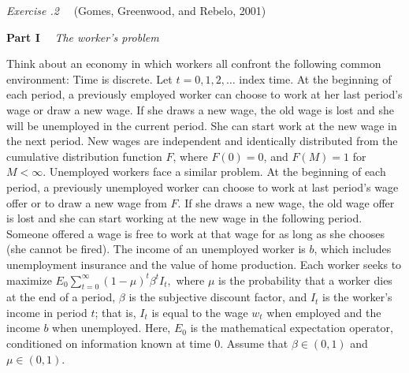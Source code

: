 \vfil\eject
\medskip\noindent
{\it Exercise \the\chapternum.2} \ \ (Gomes, Greenwood,
and Rebelo, 2001)
%

\medskip\noindent
{\bf Part I} \ \ {\it The worker's problem}

\medskip\noindent
Think about an economy in which workers  all confront the following common
environment: Time is discrete.  Let $t=0, 1, 2, \ldots$ index time.
At the beginning of each period, a  previously employed
worker can choose to work at her last
period's wage or  draw a new wage.
 If she draws a new wage, the old wage is
lost and she will be unemployed in the current period.  She can start work
at the new wage in the next period.
New wages are independent and identically
distributed from the cumulative
distribution function $F$, where $F(0)=0$, and $F(M)=1$ for $M<\infty$. Unemployed workers face a similar problem. At the beginning of each period, a previously unemployed worker can choose to work at last period's wage offer or to draw a new wage from $F$. If she draws a new wage, the old wage offer is lost and she can start working at the new wage in the following period. Someone offered a wage is free to work at that wage for as long as she
chooses (she cannot be fired).  The income of an unemployed
worker is $b$, which includes unemployment insurance and the
value of home production.  Each worker seeks to maximize
$E_0 \sum_{t=0}^\infty (1-\mu)^t \beta^t I_t, $
where $\mu$ is the probability that a worker dies at the end of a period,
$\beta$ is the subjective discount factor, and $I_t$ is the worker's income
in period $t$; that is, $I_t$ is equal to the wage $w_t$ when employed
and the income $b$ when unemployed.  Here, $E_0$ is the mathematical
expectation operator, conditioned on information known at time $0$.
Assume that $\beta \in (0,1)$ and $\mu \in (0,1)$.

